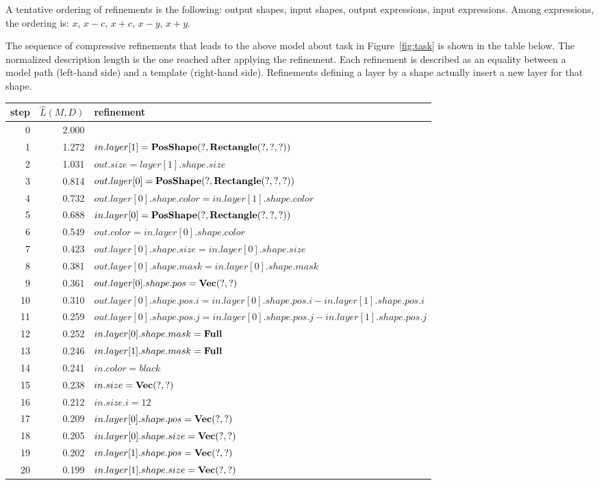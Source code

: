 \documentclass[a4paper]{llncs}
\begin{document}
A tentative ordering of refinements is the following: output shapes,
input shapes, output expressions, input expressions.  Among
expressions, the ordering is: $x$, $x-c$, $x+c$, $x-y$, $x+y$.

The sequence of compressive refinements that leads to the above model
about task in Figure~\ref{fig:task} is shown in the table below. The
normalized description length is the one reached after applying the
refinement. Each refinement is described as an equality between a
model path (left-hand side) and a template (right-hand
side). Refinements defining a layer by a shape actually insert a new
layer for that shape.

\begin{center}
  \begin{tabular}{|r|r|l|}
    \hline
    step & $\hat{L}(M,D)$ & refinement \\
    \hline
    0 & 2.000 & \\
    1 & 1.272 & $in.layer[1] = {\bf PosShape}(?, {\bf Rectangle}(?,?,?))$ \\
    2 & 1.031 & $out.size = layer[1].shape.size$ \\
    3 & 0.814 & $out.layer[0] = {\bf PosShape}(?, {\bf Rectangle}(?,?,?))$ \\
    4 & 0.732 & $out.layer[0].shape.color = in.layer[1].shape.color$ \\
    5 & 0.688 & $in.layer[0] = {\bf PosShape}(?, {\bf Rectangle}(?,?,?))$ \\
    6 & 0.549 & $out.color = in.layer[0].shape.color$ \\
    7 & 0.423 & $out.layer[0].shape.size = in.layer[0].shape.size$ \\
    8 & 0.381 & $out.layer[0].shape.mask = in.layer[0].shape.mask$ \\
    9 & 0.361 & $out.layer[0].shape.pos = {\bf Vec}(?,?)$ \\
    10 & 0.310 & $out.layer[0].shape.pos.i = in.layer[0].shape.pos.i - in.layer[1].shape.pos.i$ \\
    11 & 0.259 & $out.layer[0].shape.pos.j = in.layer[0].shape.pos.j - in.layer[1].shape.pos.j$ \\
    12 & 0.252 & $in.layer[0].shape.mask = {\bf Full}$ \\
    13 & 0.246 & $in.layer[1].shape.mask = {\bf Full}$ \\
    14 & 0.241 & $in.color = black$ \\
    15 & 0.238 & $in.size = {\bf Vec}(?,?)$ \\
    16 & 0.212 & $in.size.i = 12$ \\
    17 & 0.209 & $in.layer[0].shape.pos = {\bf Vec}(?,?)$ \\
    18 & 0.205 & $in.layer[0].shape.size = {\bf Vec}(?,?)$ \\
    19 & 0.202 & $in.layer[1].shape.pos = {\bf Vec}(?,?)$ \\
    20 & 0.199 & $in.layer[1].shape.size = {\bf Vec}(?,?)$ \\
    \hline
  \end{tabular}
\end{center}
\end{document}
